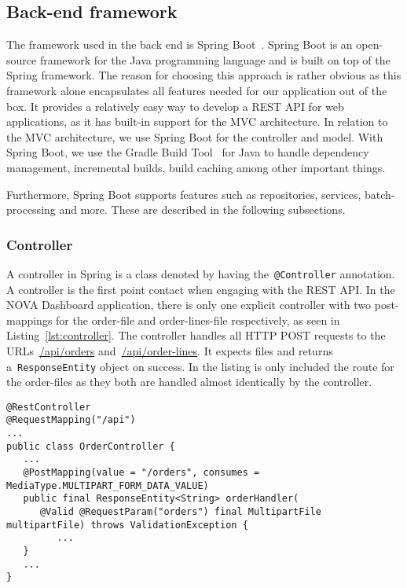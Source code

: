 \subsection{Back-end framework}\label{subsec:back-end-framework}

The framework used in the back end is Spring Boot~\cite{springboot2024}.
Spring Boot is an open-source framework for the Java programming language and is built on top of the Spring framework.
The reason for choosing this approach is rather obvious as this framework alone encapsulates all features needed for our
application out of the box.
It provides a relatively easy way to develop a REST API for web applications, as it has built-in support for the MVC
architecture.
In relation to the MVC architecture, we use Spring Boot for the controller and model.
With Spring Boot, we use the Gradle Build Tool~\cite{gradle2024} for Java to handle dependency management, incremental
builds, build caching among other important things.

Furthermore, Spring Boot supports features such as repositories, services, batch-processing and more.
These are described in the following subsections.

\subsubsection{Controller}
A controller in Spring is a class denoted by having the~\texttt{@Controller} annotation.
A controller is the first point contact when engaging with the REST API\@.
In the NOVA Dashboard application, there is only one explicit controller with two post-mappings for the order-file and
order-lines-file respectively, as seen in Listing~\ref{lst:controller}.
The controller handles all HTTP POST requests to the URLs~\url{/api/orders} and~\url{/api/order-lines}.
It expects files and returns a~\texttt{ResponseEntity} object on success.
In the listing is only included the route for the order-files as they both are handled almost identically by the
controller.

\begin{lstlisting}[style=java, caption=A selection of code from the main controller in the application.
Dots (...) represent skipped code.,label={lst:controller}]
@RestController
@RequestMapping("/api")
...
public class OrderController {
   ...
   @PostMapping(value = "/orders", consumes = MediaType.MULTIPART_FORM_DATA_VALUE)
   public final ResponseEntity<String> orderHandler(
      @Valid @RequestParam("orders") final MultipartFile multipartFile) throws ValidationException {
         ...
   }
   ...
}
\end{lstlisting}

